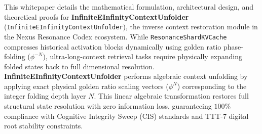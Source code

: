 \begin{abstractbox}
This whitepaper details the mathematical formulation, architectural design, and theoretical proofs for \textbf{InfiniteEInfinityContextUnfolder} (\texttt{InfiniteEInfinityContextUnfolder}), the inverse context restoration module in the Nexus Resonance Codex ecosystem. While \texttt{ResonanceShardKVCache} compresses historical activation blocks dynamically using golden ratio phase-folding ($\phi^{-N}$), ultra-long-context retrieval tasks require physically expanding folded states back to full dimensional resolution. \textbf{InfiniteEInfinityContextUnfolder} performs algebraic context unfolding by applying exact physical golden ratio scaling vectors ($\phi^N$) corresponding to the integer folding depth layer $N$. This linear algebraic transformation restores full structural state resolution with zero information loss, guaranteeing $100\%$ compliance with Cognitive Integrity Sweep (CIS) standards and TTT-7 digital root stability constraints.
\end{abstractbox}
